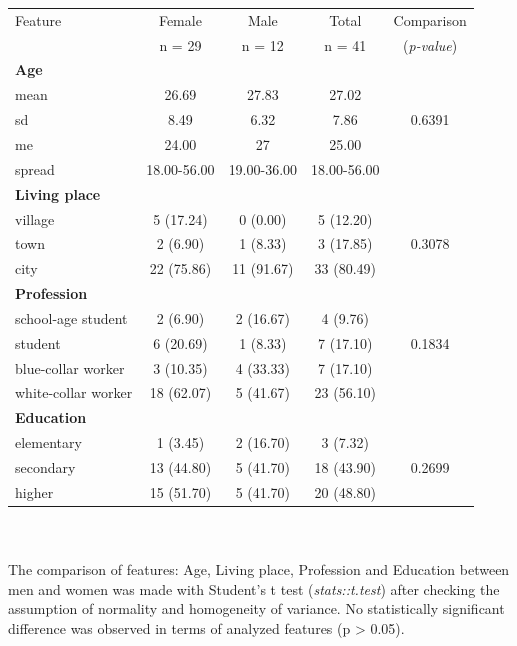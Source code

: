 \documentclass[12pt,a4paper,notitlepage]{report}
\begin{document}
\begin{tabular}{lcccc}
\hline Feature 				& Female 	& Male 		& Total 		&  Comparison \\
 		 					& n = 29 	& n = 12	& n = 41	&  (\textit{p-value}) \\
\hline
\bf{Age}					&			&			&			&		\\
\indent mean				& 26.69		& 27.83		& 27.02		& 		\\
\indent sd					& 8.49		& 6.32		& 7.86		& 0.6391 \\
\indent me					& 24.00		& 27		& 25.00		& 		\\
\indent spread				& 18.00-56.00 & 19.00-36.00	& 18.00-56.00 & \\
\hline

\bf{Living place} 			&			&			&			&		\\
\indent village				& 5 (17.24)	& 0 (0.00)	& 5	(12.20)	& 		\\
\indent town					& 2 (6.90)	& 1	(8.33) 	& 3	(17.85) 	&  0.3078 \\
\indent city					& 22 (75.86)	& 11 (91.67) & 33 (80.49) & 		\\
\hline

\bf{Profession} 				&			&			&			&		\\
\indent school-age student	& 2 (6.90)	& 2 (16.67)	& 4	(9.76) 	& 		\\
\indent student				& 6 (20.69)	& 1	(8.33) 	& 7	(17.10) 	& 0.1834 \\
\indent blue-collar worker		& 3 (10.35)	& 4 (33.33) 	& 7 (17.10) 	& 		\\
\indent white-collar worker	& 18 (62.07)	& 5 (41.67) 	& 23 (56.10) & 		\\
\hline

\bf{Education} 				&			&			&			&		\\
\indent elementary			& 1 (3.45)	& 2 (16.70)	& 3	(7.32) 	& 		\\
\indent secondary			& 13 (44.80)	& 5	(41.70) 	& 18 (43.90) & 0.2699 \\
\indent higher				& 15 (51.70)	& 5 (41.70) 	& 20 (48.80) & 		\\
\hline

\end{tabular} \\ \\

The comparison of features: Age, Living place, Profession and Education between men and women was made with Student's t test (\textit{stats::t.test}) after checking the assumption of normality and homogeneity of variance. No statistically significant difference was observed in terms of analyzed features (p > 0.05).
\end{document}
